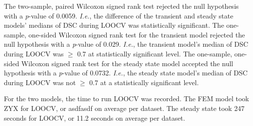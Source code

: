 \documentclass[12pt]{article}
\begin{document}
The two-sample, paired Wilcoxon signed rank test rejected the null hypothesis
with a \textit{p}-value of 0.0059.
\textit{I.e.}, the difference of the transient and steady state models' medians of DSC
during LOOCV was statistically significant.
The one-sample, one-sided Wilcoxon signed rank test for the transient model
rejected the null hypothesis with a \textit{p}-value of 0.029.
\textit{I.e.}, the transient model's median of DSC during LOOCV was $\geq$
0.7 at statistically significant level.
The one-sample, one-sided Wilcoxon signed rank test for the steady state model
accepted the null hypothesis with a \textit{p}-value of 0.0732.
\textit{I.e.}, the steady state model's median of DSC during LOOCV was
not $\geq$ 0.7 at a statistically significant level.

{\color{red}For the two models, the time to run LOOCV
was recorded. The FEM model took ZYX for LOOCV, or asdfasdf on average per dataset.
The steady state took 247 seconds for LOOCV, or 11.2 seconds on average per dataset. }


\end{document}
